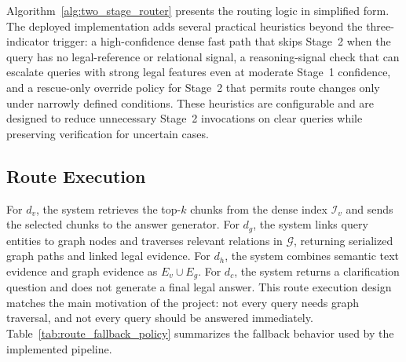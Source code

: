 \documentclass[11pt,twocolumn]{article}
\begin{document}
Algorithm~\ref{alg:two_stage_router} presents the routing
logic in simplified form. The deployed implementation adds
several practical heuristics beyond the three-indicator
trigger: a high-confidence dense fast path that skips
Stage~2 when the query has no legal-reference or
relational signal, a reasoning-signal check that can
escalate queries with strong legal features even at
moderate Stage~1 confidence, and a rescue-only override
policy for Stage~2 that permits route changes only under
narrowly defined conditions. These heuristics are
configurable and are designed to reduce unnecessary
Stage~2 invocations on clear queries while preserving
verification for uncertain cases.

\subsection{Route Execution}
\label{subsec:route_execution}

For $d_v$, the system retrieves the top-$k$ chunks from the
dense index $\mathcal{I}_v$ and sends the selected chunks to
the answer generator. For $d_g$, the system links query
entities to graph nodes and traverses relevant relations in
$\mathcal{G}$, returning serialized graph paths and linked
legal evidence. For $d_h$, the system combines semantic text
evidence and graph evidence as $E_v\cup E_g$. For $d_c$, the
system returns a clarification question and does not generate
a final legal answer. This route execution design matches the
main motivation of the project: not every query needs graph
traversal, and not every query should be answered
immediately. Table~\ref{tab:route_fallback_policy} summarizes
the fallback behavior used by the implemented pipeline.
\end{document}

